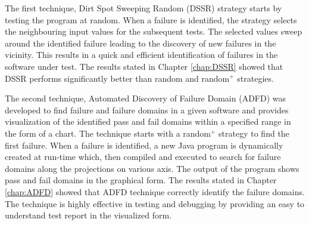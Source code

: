 






The first technique, Dirt Spot Sweeping Random (DSSR) strategy starts by testing the program at random. When a failure is identified, the strategy selects the neighbouring input values for the subsequent tests. The selected values sweep around the identified failure leading to the discovery of new failures in the vicinity. This results in a quick and efficient identification of failures in the software under test. The results stated in Chapter \ref{chap:DSSR} showed that DSSR performs significantly better than random and random$^+$ strategies.

The second technique, Automated Discovery of Failure Domain (ADFD) was developed to find failure and failure domains in a given software and provides visualization of the identified pass and fail domains within a specified range in the form of a chart. The technique starts with a random$^+$ strategy to find the first failure. When a failure is identified, a new Java program is dynamically created at run-time which, then compiled and executed to search for failure domains along the projections on various axis. The output of the program shows pass and fail domains in the graphical form. The results stated in Chapter \ref{chap:ADFD} showed that ADFD technique correctly identify the failure domains. The technique is highly effective in testing and debugging by providing an easy to understand test report in the visualized form. 

